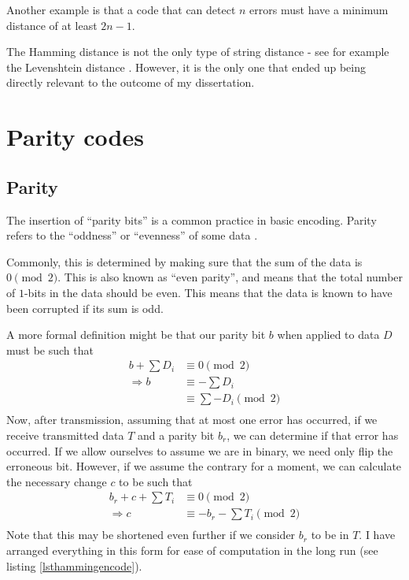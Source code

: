 \documentclass[a4paper,11pt]{article}
\begin{document}
    Another example is that a code that can detect $n$ errors must have a
    minimum distance of at least $2n-1$.

    The Hamming distance is not the only type of string distance - see for
    example the Levenshtein distance
    \cite{Levenshtein2001Navarro,StringToString1974Wagner}. However, it is the
    only one that ended up being directly relevant to the outcome of my
    dissertation.

    \section{Parity codes}

    \subsection{Parity}

    The insertion of ``parity bits'' is a common practice in basic encoding.
    Parity refers to the ``oddness'' or ``evenness'' of some data
    \cite{Parity2008Knuth}.

    Commonly, this is determined by making sure that the sum of the data is $0
    \pmod{2}$. This is also known as ``even parity'', and means that the total
    number of $1$-bits in the data should be even.  This means that the data is
    known to have been corrupted if its sum is odd.

    A more formal definition might be that our parity bit $b$ when applied to
    data $D$ must be such that
    \begin{align*}
    b + \sum D_i  &\equiv 0 \pmod 2 \\
    \Rightarrow b &\equiv - \sum D_i \\
                  &\equiv \sum -D_i \pmod 2\\
    \end{align*}
    Now, after transmission, assuming that at most one error has occurred, if we
    receive transmitted data $T$ and a parity bit $b_r$, we can determine if
    that error has occurred. If we allow ourselves to assume we are in binary,
    we need only flip the erroneous bit. However, if we assume the contrary for
    a moment, we can calculate the necessary change $c$ to be such that
    \begin{align*}
    b_r + c + \sum T_i &\equiv 0 \pmod 2 \\
    \Rightarrow c &\equiv -b_r - \sum T_i \pmod 2 \\
    \end{align*}
    Note that this may be shortened even further if we consider $b_r$ to be in
    $T$. I have arranged everything in this form for ease of computation in the
    long run (see listing \ref{lsthammingencode}).
\end{document}
